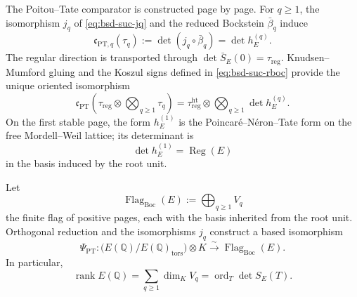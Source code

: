 The Poitou--Tate comparator is constructed page by page. For
\(q\geq1\), the isomorphism \(j_q\) of
\eqref{eq:bsd-suc-jq} and the reduced Bockstein
\(\bar\beta_q\) induce
\begin{equation}\label{eq:amp-bsd-comparador-pt-q}
 \mathfrak c_{\mathrm{PT},q}(\tau_q)
 :=\det\!\left(j_q\circ\bar\beta_q\right)
 =\det h_E^{(q)}.
\end{equation}
The regular direction is transported through
\(\det\bar S_E(0)=\tau_{\mathrm{reg}}\). Knudsen--Mumford gluing and the
Koszul signs defined in \eqref{eq:bsd-suc-rboc} provide the unique
oriented isomorphism
\begin{equation}\label{eq:amp-bsd-comparador-pt}
 \mathfrak c_{\mathrm{PT}}
 \left(\tau_{\mathrm{reg}}\otimes\bigotimes_{q\geq1}\tau_q\right)
 =\tau_{\mathrm{reg}}^{\mathrm{ht}}
  \otimes\bigotimes_{q\geq1}\det h_E^{(q)}.
\end{equation}
On the first stable page, the form \(h_E^{(1)}\) is the
Poincaré--Néron--Tate form on the free Mordell--Weil lattice; its determinant is
\begin{equation}\label{eq:amp-bsd-regulador-nt}
 \det h_E^{(1)}=\operatorname{Reg}(E)
\end{equation}
in the basis induced by the root unit.

\begin{lemma}
\label{lem:amp-bsd-grado-pt}
Let
\[
 \operatorname{Flag}_{\mathrm{Boc}}(E)
 :=\bigoplus_{q\geq1}V_q
\]
the finite flag of positive pages, each with the basis inherited from the
root unit. Orthogonal reduction and the isomorphisms \(j_q\) construct a
based isomorphism
\begin{equation}\label{eq:amp-bsd-psi-pt}
 \Psi_{\mathrm{PT}}:
 \bigl(E(\mathbb Q)/E(\mathbb Q)_{\mathrm{tors}}\bigr)\otimes K
 \xrightarrow{\ \sim\ }\operatorname{Flag}_{\mathrm{Boc}}(E).
\end{equation}
In particular,
\begin{equation}\label{eq:amp-bsd-rango-bandera}
 \operatorname{rank}E(\mathbb Q)
 =\sum_{q\geq1}\dim_KV_q
 =\operatorname{ord}_T\det S_E(T).
\end{equation}
\end{lemma}

